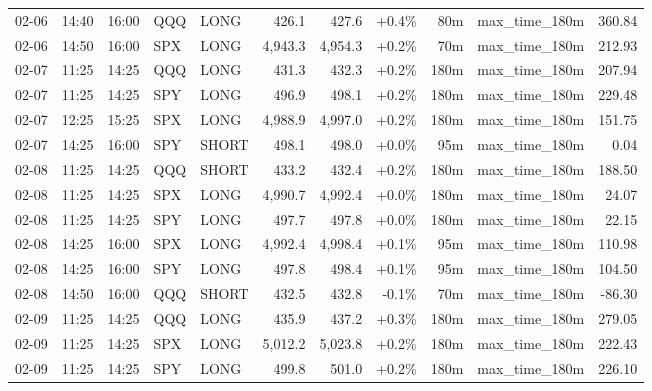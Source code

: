 \documentclass[11pt,a4paper,twoside]{article}
\begin{document}
\begin{center}
\begin{longtable}{>{\color{txtmain}}l l l l l r r r r >{\color{txtmain}}l r}
02-06 & 14:40 & 16:00 & QQQ & LONG & 426.1 & 427.6 & \textcolor{wingreen}{+0.4\%} & 80m & max\_time\_180m & \textcolor{wingreen}{360.84} \\
02-06 & 14:50 & 16:00 & SPX & LONG & 4,943.3 & 4,954.3 & \textcolor{wingreen}{+0.2\%} & 70m & max\_time\_180m & \textcolor{wingreen}{212.93} \\
02-07 & 11:25 & 14:25 & QQQ & LONG & 431.3 & 432.3 & \textcolor{wingreen}{+0.2\%} & 180m & max\_time\_180m & \textcolor{wingreen}{207.94} \\
02-07 & 11:25 & 14:25 & SPY & LONG & 496.9 & 498.1 & \textcolor{wingreen}{+0.2\%} & 180m & max\_time\_180m & \textcolor{wingreen}{229.48} \\
02-07 & 12:25 & 15:25 & SPX & LONG & 4,988.9 & 4,997.0 & \textcolor{wingreen}{+0.2\%} & 180m & max\_time\_180m & \textcolor{wingreen}{151.75} \\
02-07 & 14:25 & 16:00 & SPY & SHORT & 498.1 & 498.0 & \textcolor{wingreen}{+0.0\%} & 95m & max\_time\_180m & \textcolor{wingreen}{0.04} \\
02-08 & 11:25 & 14:25 & QQQ & SHORT & 433.2 & 432.4 & \textcolor{wingreen}{+0.2\%} & 180m & max\_time\_180m & \textcolor{wingreen}{188.50} \\
02-08 & 11:25 & 14:25 & SPX & LONG & 4,990.7 & 4,992.4 & \textcolor{wingreen}{+0.0\%} & 180m & max\_time\_180m & \textcolor{wingreen}{24.07} \\
02-08 & 11:25 & 14:25 & SPY & LONG & 497.7 & 497.8 & \textcolor{wingreen}{+0.0\%} & 180m & max\_time\_180m & \textcolor{wingreen}{22.15} \\
02-08 & 14:25 & 16:00 & SPX & LONG & 4,992.4 & 4,998.4 & \textcolor{wingreen}{+0.1\%} & 95m & max\_time\_180m & \textcolor{wingreen}{110.98} \\
02-08 & 14:25 & 16:00 & SPY & LONG & 497.8 & 498.4 & \textcolor{wingreen}{+0.1\%} & 95m & max\_time\_180m & \textcolor{wingreen}{104.50} \\
02-08 & 14:50 & 16:00 & QQQ & SHORT & 432.5 & 432.8 & \textcolor{lossred}{-0.1\%} & 70m & max\_time\_180m & \textcolor{lossred}{-86.30} \\
02-09 & 11:25 & 14:25 & QQQ & LONG & 435.9 & 437.2 & \textcolor{wingreen}{+0.3\%} & 180m & max\_time\_180m & \textcolor{wingreen}{279.05} \\
02-09 & 11:25 & 14:25 & SPX & LONG & 5,012.2 & 5,023.8 & \textcolor{wingreen}{+0.2\%} & 180m & max\_time\_180m & \textcolor{wingreen}{222.43} \\
02-09 & 11:25 & 14:25 & SPY & LONG & 499.8 & 501.0 & \textcolor{wingreen}{+0.2\%} & 180m & max\_time\_180m & \textcolor{wingreen}{226.10} \\

\end{longtable}
\end{center}
\end{document}
